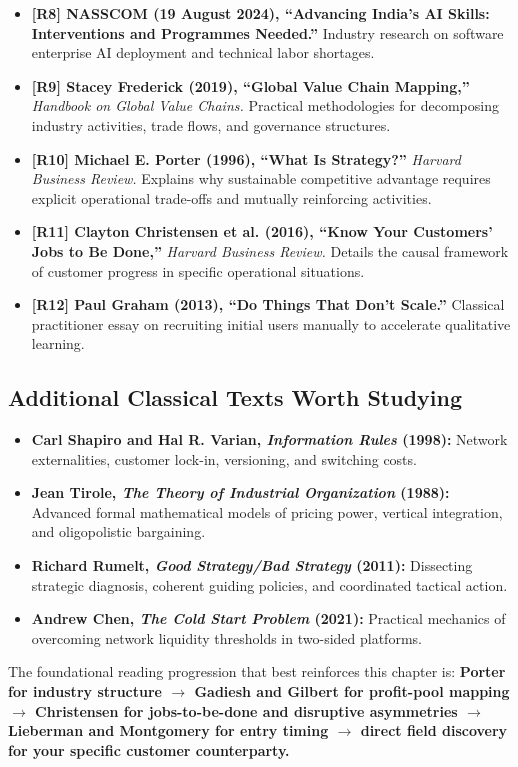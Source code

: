 \begin{itemize}[leftmargin=14pt,itemsep=3pt,topsep=2pt]
  \item \textbf{[R8] NASSCOM (19 August 2024), ``Advancing India's AI Skills: Interventions and Programmes Needed.''} Industry research on software enterprise AI deployment and technical labor shortages.
  \item \textbf{[R9] Stacey Frederick (2019), ``Global Value Chain Mapping,''} \textit{Handbook on Global Value Chains.} Practical methodologies for decomposing industry activities, trade flows, and governance structures.
  \item \textbf{[R10] Michael E. Porter (1996), ``What Is Strategy?''} \textit{Harvard Business Review.} Explains why sustainable competitive advantage requires explicit operational trade-offs and mutually reinforcing activities.
  \item \textbf{[R11] Clayton Christensen et al. (2016), ``Know Your Customers' Jobs to Be Done,''} \textit{Harvard Business Review.} Details the causal framework of customer progress in specific operational situations.
  \item \textbf{[R12] Paul Graham (2013), ``Do Things That Don't Scale.''} Classical practitioner essay on recruiting initial users manually to accelerate qualitative learning.
\end{itemize}

\subsection*{Additional Classical Texts Worth Studying}

\begin{itemize}[leftmargin=12pt,itemsep=2pt,topsep=1pt]
  \item \textbf{Carl Shapiro and Hal R. Varian, \textit{Information Rules} (1998):} Network externalities, customer lock-in, versioning, and switching costs.
  \item \textbf{Jean Tirole, \textit{The Theory of Industrial Organization} (1988):} Advanced formal mathematical models of pricing power, vertical integration, and oligopolistic bargaining.
  \item \textbf{Richard Rumelt, \textit{Good Strategy/Bad Strategy} (2011):} Dissecting strategic diagnosis, coherent guiding policies, and coordinated tactical action.
  \item \textbf{Andrew Chen, \textit{The Cold Start Problem} (2021):} Practical mechanics of overcoming network liquidity thresholds in two-sided platforms.
\end{itemize}

The foundational reading progression that best reinforces this chapter is: \textbf{Porter for industry structure $\to$ Gadiesh and Gilbert for profit-pool mapping $\to$ Christensen for jobs-to-be-done and disruptive asymmetries $\to$ Lieberman and Montgomery for entry timing $\to$ direct field discovery for your specific customer counterparty.}

